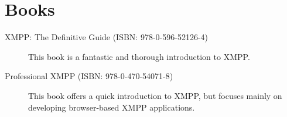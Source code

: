 \newpage

\section{Books}

\begin{description}
\item[XMPP: The Definitive Guide (ISBN: 978-0-596-52126-4)] This book is a fantastic and thorough introduction to XMPP.
\item[Professional XMPP (ISBN: 978-0-470-54071-8)] This book offers a quick introduction to XMPP, but focuses mainly on developing browser-based XMPP applications.
\end{description}
